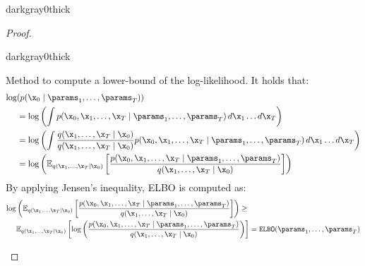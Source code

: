 \begin{description}
\begin{description}
\begin{marginbar}{darkgray}{0}{thick}
\begin{proof}
                    \indenttbox
                    \begin{marginbar}{darkgray}{0}{thick}
                    \begin{lemma} 
                        Method to compute a lower-bound of the log-likelihood. It holds that:
                        \[ 
                            \begin{split}
                                \log&(p(\x_0 \mid \params_1, \dots, \params_T)) \\ 
                                &= \log\left( \int p(\x_0, \x_1, \dots, \x_T \mid \params_1, \dots, \params_T) \, d\x_1 \dots d\x_T \right) \\
                                &= \log\left( \int \frac{q(\x_1, \dots, \x_T \mid \x_0)}{q(\x_1, \dots, \x_T \mid \x_0)} p(\x_0, \x_1, \dots, \x_T \mid \params_1, \dots, \params_T) \, d\x_1 \dots d\x_T \right) \\
                                &= \log\left( \mathbb{E}_{q(\x_1, \dots, \x_T \mid \x_0)}\left[ \frac{p(\x_0, \x_1, \dots, \x_T \mid \params_1, \dots, \params_T)}{q(\x_1, \dots, \x_T \mid \x_0)} \right] \right) \\
                            \end{split}
                        \]
                        By applying Jensen's inequality, ELBO is computed as:
                        \[
                            \begin{split}
                                \log&\left( \mathbb{E}_{q(\x_1, \dots, \x_T \mid \x_0)}\left[ \frac{p(\x_0, \x_1, \dots, \x_T \mid \params_1, \dots, \params_T)}{q(\x_1, \dots, \x_T \mid \x_0)} \right] \right) \geq \\
                                &\mathbb{E}_{q(\x_1, \dots, \x_T \mid \x_0)}\left[ \log\left( \frac{p(\x_0, \x_1, \dots, \x_T \mid \params_1, \dots, \params_T)}{q(\x_1, \dots, \x_T \mid \x_0)} \right) \right] = \texttt{ELBO}(\params_1, \dots, \params_T)
                            \end{split}
                        \]
                    \end{lemma}
                    \end{marginbar}


\end{proof}
\end{marginbar}
\end{description}
\end{description}
